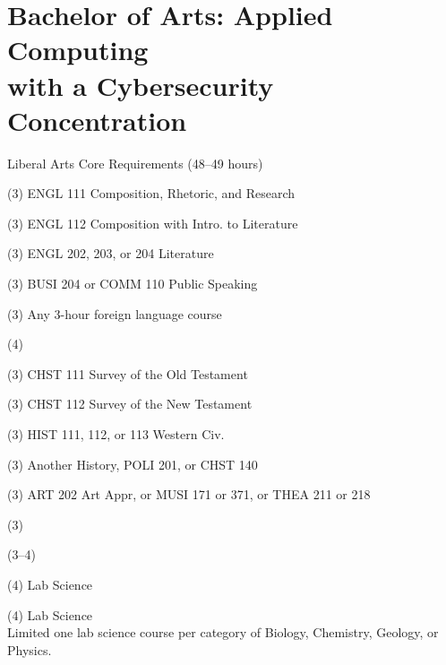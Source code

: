 \label{program:ba-app-cyber}%
\section*{Bachelor of Arts: Applied Computing\\with a Cybersecurity Concentration}

\begin{reqgroup}{Liberal Arts Core Requirements (48--49 hours)}
\begin{checklist}
\begin{minipage}[t]{0.5\linewidth}
	\item (3) ENGL 111 Composition, Rhetoric, and Research
	\item (3) ENGL 112 Composition with Intro\@. to Literature
	\item (3) ENGL 202, 203, or 204 Literature
	\item (3) BUSI 204 or COMM 110 Public Speaking
	\item (3) Any 3-hour foreign language course
	\item (4) 
	\item (3) CHST 111  Survey of the Old Testament
	\item (3) CHST 112  Survey of the New Testament
	\item (3) HIST 111, 112, or 113 Western Civ.
\end{minipage}
\begin{minipage}[t]{0.5\linewidth}
	\item (3)	Another History, POLI 201, or CHST 140
	\item (3)	ART 202 Art Appr, or MUSI 171 or 371, or THEA 211 or 218
	\item (3)	
	\item (3--4)	
	\item (4)	Lab Science
	\item (4)	Lab Science\\Limited one lab science course per category of Biology, Chemistry,
Geology, or Physics.
\end{minipage}
\end{checklist}
\end{reqgroup}

